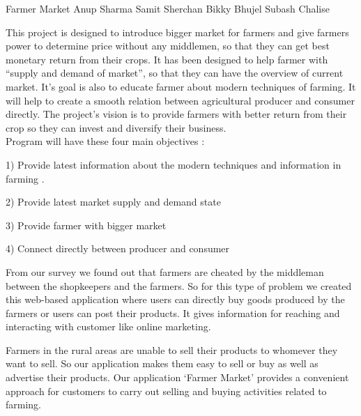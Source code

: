  \begin{conf-abstract}[]
 {Farmer Market }
 {Anup Sharma
 	Samit Sherchan
 	Bikky Bhujel
 	Subash Chalise
 }
{}

This project is designed to introduce bigger market for farmers and give farmers power to determine price without any middlemen, so that they can get best monetary return from their crops. It has been designed to help farmer with “supply and demand of market”, so that they can have the overview of current market. It’s goal is also to educate farmer about modern techniques of farming. It will help to create a smooth relation between agricultural producer and consumer directly. The project’s vision is to provide farmers with better return from their crop so they can invest and diversify their business.
\\
Program will have these four main objectives :

1) Provide latest information about the modern techniques and information in farming .

2) Provide latest market supply and demand state

3) Provide farmer with bigger market

4) Connect directly between producer and consumer

From our survey we found out that farmers are cheated by the middleman between the shopkeepers and the farmers. So for this type of problem we created this web-based application where users can directly buy goods produced by the farmers or users can post their products. It gives information for reaching and interacting with customer like online marketing. 

Farmers in the rural areas are unable to sell their products to whomever they want to sell. So our application makes them easy to sell or buy as well as advertise their products. Our application `Farmer Market' provides a convenient approach for customers to carry out selling and buying activities related to farming.

 \end{conf-abstract}